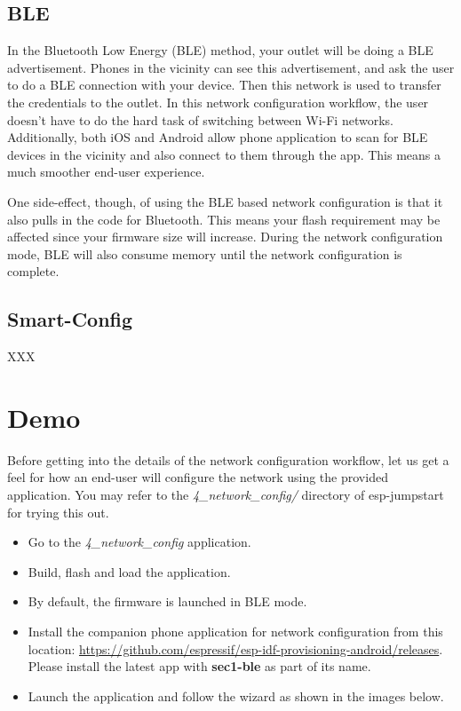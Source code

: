 \documentclass[main.tex]{subfiles}
\begin{document}
\subsection{BLE}

In the Bluetooth Low Energy (BLE) method, your outlet will be doing a BLE advertisement. Phones in the vicinity can see this advertisement, and ask the user to do a BLE connection with your device. Then this network is used to transfer the credentials to the outlet.
In this network configuration workflow, the user doesn't have to do the hard task of switching between Wi-Fi networks. Additionally, both iOS and Android allow phone application to scan for BLE devices in the vicinity and also connect to them through the app. This means a much smoother end-user experience.

One side-effect, though, of using the BLE based network configuration is that it also pulls in the code for Bluetooth. This means your flash requirement may be affected since your firmware size will increase. During the network configuration mode, BLE will also consume memory until the network configuration is complete.

\subsection{Smart-Config}
XXX

\section{Demo}
Before getting into the details of the network configuration workflow, let us get a feel for how an end-user will configure the network using the provided application.
You may refer to the \textit{4\_network\_config/} directory of esp-jumpstart for trying this out.

\begin{itemize}
    \item Go to the \textit{4\_network\_config} application.
    \item Build, flash and load the application.
    \item By default, the firmware is launched in BLE mode.
    \item Install the companion phone application for network configuration from this location: \url{https://github.com/espressif/esp-idf-provisioning-android/releases}. Please install the latest app with \textbf{sec1-ble} as part of its name.
    \item Launch the application and follow the wizard as shown in the images below.
\end{itemize}
\end{document}
